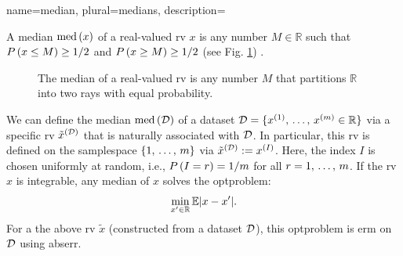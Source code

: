 {name={median}, 
plural={medians},
	description={A median $\mathrm{med}\,(x)$ of a real-valued \gls{rv} $x$ 
 		is any number $M \in \mathbb{R}$ such that $P\left( x \leq M\right) \geq 1/2$ and 
		$P\left( x \geq M\right) \geq 1/2$ 
		(see Fig. \ref{fig_median1_dict}) \cite{LC}. 
 		\begin{figure}[H]
			\begin{center}
			\end{center}
			\caption{The median of a real-valued \gls{rv} is any number $M$ 
			that partitions $\mathbb{R}$ into two rays with equal \gls{probability}. \label{fig_median1_dict}}
 		\end{figure}  
 		We can define the median $\mathrm{med}\,(\mathcal{D})$ 
 		of a \gls{dataset} $\mathcal{D} = \{ x^{(1)}, \,\ldots, \,x^{(m)} \in \mathbb{R} \}$ 
 		via a specific \gls{rv} $\tilde{x}^{(\mathcal{D})}$ that is naturally associated with $\mathcal{D}$. 
 		In particular, this \gls{rv} is defined on the \gls{samplespace} $\{1, \,\ldots, \,m\}$ 
		via $\tilde{x}^{(\mathcal{D})} := x^{(I)}$. Here, the index $I$ is chosen uniformly 
		at random, i.e., $P\left(I = r\right)=1/m$ for 
 		all $r=1, \,\ldots, \,m$. If the \gls{rv} $x$ is integrable, any 
		median of $x$ solves the \gls{optproblem}: 
 		$$\min_{x' \in \mathbb{R}} \mathbb{E}{|x - x'|}.$$ 
		For a the above \gls{rv} $\tilde{x}$ (constructed from a \gls{dataset} $\mathcal{D}$), 
		this \gls{optproblem} is \gls{erm} on $\mathcal{D}$ using \gls{abserr}. 
}}
